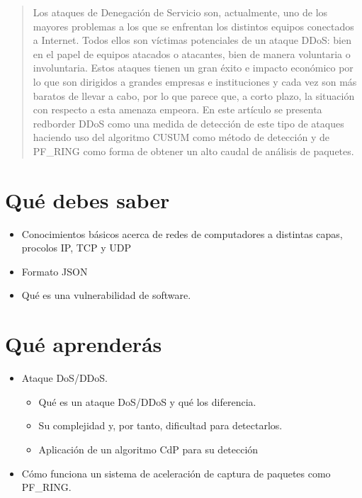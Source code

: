 
\begin{abstract}
Los ataques de Denegación de Servicio son, actualmente, uno de los mayores problemas a los que se
enfrentan los distintos equipos conectados a Internet. Todos ellos son víctimas potenciales de un
ataque DDoS: bien en el papel de equipos atacados o atacantes, bien de manera voluntaria o involuntaria.
Estos ataques tienen un gran éxito e impacto económico por lo que son dirigidos a grandes empresas e instituciones y cada vez son más
baratos de llevar a cabo, por lo que parece que, a corto plazo, la situación con respecto a esta amenaza empeora.
En este artículo se presenta redborder DDoS como una medida de detección de este tipo de ataques haciendo uso del
algoritmo CUSUM como método de detección y de PF\_RING como forma de obtener un alto caudal de análisis
de paquetes.
\end{abstract}

\section*{Qué debes saber}
\begin{itemize}
\item Conocimientos básicos acerca de redes de computadores a distintas capas,
procolos \gls{IP}, \gls{TCP} y \gls{UDP}
\item Formato \gls{JSON}
\item Qué es una vulnerabilidad de software.
\end{itemize}

\section*{Qué aprenderás}
\begin{itemize}
\item Ataque DoS/DDoS.
  \begin{itemize}
  \item Qué es un ataque DoS/DDoS y qué los diferencia.
  \item Su complejidad y, por tanto, dificultad para detectarlos.
  \item Aplicación de un algoritmo \gls{CdP} para su detección
  \end{itemize}
\item Cómo funciona un sistema de aceleración de captura de paquetes como
      PF\_RING.
\end{itemize}
